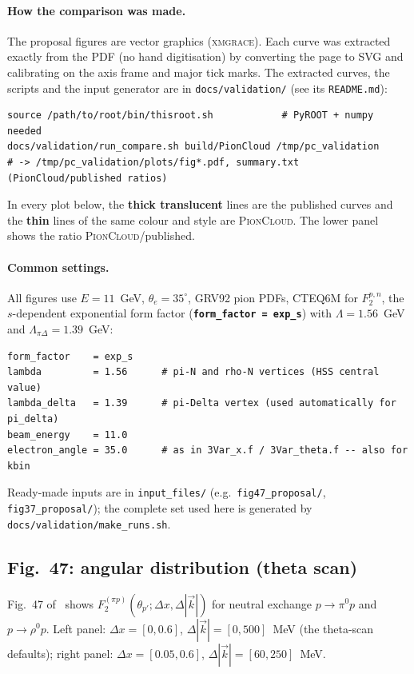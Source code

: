 \documentclass[11pt,a4paper]{article}
\newcommand{\picloud}{\textsc{PionCloud}}
\newcommand{\inikey}[1]{\texttt{\textbf{#1}}}
\begin{document}
\paragraph{How the comparison was made.}
The proposal figures are vector graphics (\textsc{xmgrace}).  Each curve
was extracted exactly from the PDF (no hand digitisation) by converting
the page to SVG and calibrating on the axis frame and major tick marks.
The extracted curves, the scripts and the input generator are in
\texttt{docs/validation/} (see its \texttt{README.md}):
\begin{lstlisting}[style=bashstyle]
source /path/to/root/bin/thisroot.sh            # PyROOT + numpy needed
docs/validation/run_compare.sh build/PionCloud /tmp/pc_validation
# -> /tmp/pc_validation/plots/fig*.pdf, summary.txt (PionCloud/published ratios)
\end{lstlisting}
In every plot below, the \textbf{thick translucent} lines are the published
curves and the \textbf{thin} lines of the same colour and style are
\picloud{}.  The lower panel shows the ratio \picloud{}/published.

\paragraph{Common settings.}
All figures use $E=11$~GeV, $\theta_e=35^\circ$, GRV92 pion PDFs, CTEQ6M
for $F_2^{p,n}$, the $s$-dependent exponential form factor
(\inikey{form\_factor = exp\_s}) with $\Lambda=1.56$~GeV and
$\Lambda_{\pi\Delta}=1.39$~GeV:
\begin{lstlisting}[style=iniStyle]
form_factor    = exp_s
lambda         = 1.56      # pi-N and rho-N vertices (HSS central value)
lambda_delta   = 1.39      # pi-Delta vertex (used automatically for pi_delta)
beam_energy    = 11.0
electron_angle = 35.0      # as in 3Var_x.f / 3Var_theta.f -- also for kbin
\end{lstlisting}
Ready-made inputs are in \texttt{input\_files/} (e.g.\
\texttt{fig47\_proposal/}, \texttt{fig37\_proposal/}); the complete set
used here is generated by \texttt{docs/validation/make\_runs.sh}.

\subsection{Fig.~47: angular distribution (theta scan)}

Fig.~47 of~\cite{TDIS15} shows $F_2^{(\pi p)}(\theta_{p'};\Delta x,\Delta|\vec k|)$
for neutral exchange $p\to\pi^0p$ and $p\to\rho^0p$.
Left panel: $\Delta x=[0,0.6]$, $\Delta|\vec k|=[0,500]$~MeV
(the theta-scan defaults); right panel: $\Delta x=[0.05,0.6]$,
$\Delta|\vec k|=[60,250]$~MeV.
\end{document}
